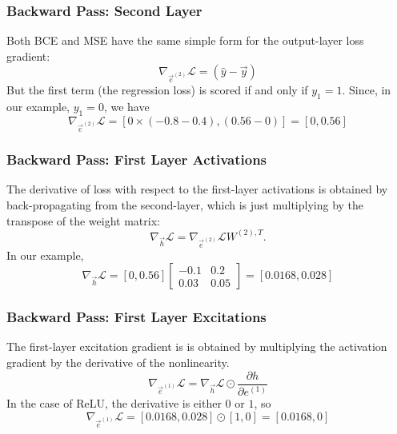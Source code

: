 \documentclass{beamer}
\begin{document}
\begin{frame}
  \frametitle{Backward Pass: Second Layer}

  Both BCE and MSE have the same simple form for the output-layer loss
  gradient:
  \begin{displaymath}
    \nabla_{\vec{e}^{(2)}}{\mathcal L}=
    \left(\hat{y}-\vec{y}\right)
  \end{displaymath}
  But the first term (the regression loss) is scored if and only if
  $y_1=1$.  Since, in our example, $y_1=0$, we have
  \begin{displaymath}
    \nabla_{\vec{e}^{(2)}}{\mathcal L}
    = [0\times(-0.8-0.4), (0.56-0)]=[0, 0.56]
  \end{displaymath}
\end{frame}

\begin{frame}
  \frametitle{Backward Pass: First Layer Activations}

  The derivative of loss with respect to the first-layer activations
  is obtained by back-propagating from the second-layer, which is just
  multiplying by the transpose of the weight matrix:
  \begin{displaymath}
    \nabla_{\vec{h}}{\mathcal L}=
    \nabla_{\vec{e}^{(2)}}{\mathcal L}W^{(2),T}.
  \end{displaymath}
  In our example,
  \begin{displaymath}
    \nabla_{\vec{h}}{\mathcal L}=    
          [0,0.56]\left[\begin{array}{cc}-0.1&0.2\\0.03&0.05\end{array}\right]    =
          [0.0168,0.028]
  \end{displaymath}
\end{frame}

\begin{frame}
  \frametitle{Backward Pass: First Layer Excitations}

  The first-layer excitation gradient is is obtained by multiplying
  the activation gradient by the derivative of the nonlinearity.  
  \begin{displaymath}
    \nabla_{\vec{e}^{(1)}}{\mathcal L}=
    \nabla_{\vec{h}}{\mathcal L}\odot \frac{\partial h}{\partial e^{(1)}}
  \end{displaymath}
  In the case of ReLU, the derivative is either $0$ or $1$, so
  \begin{displaymath}
    \nabla_{\vec{e}^{(1)}}{\mathcal L}=    
          [0.0168,0.028] \odot [1,0] = 
          [0.0168,0]
  \end{displaymath}
\end{frame}
\end{document}
